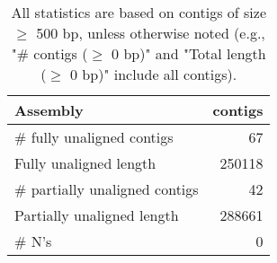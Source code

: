 \documentclass[12pt,a4paper]{article}
\begin{document}
\begin{table}[ht]
\begin{center}
\caption{All statistics are based on contigs of size $\geq$ 500 bp, unless otherwise noted (e.g., "\# contigs ($\geq$ 0 bp)" and "Total length ($\geq$ 0 bp)" include all contigs).}
\begin{tabular}{|l*{1}{|r}|}
\hline
Assembly & contigs \\ \hline
\# fully unaligned contigs & 67 \\ \hline
Fully unaligned length & 250118 \\ \hline
\# partially unaligned contigs & 42 \\ \hline
Partially unaligned length & 288661 \\ \hline
\# N's & 0 \\ \hline
\end{tabular}
\end{center}
\end{table}
\end{document}
